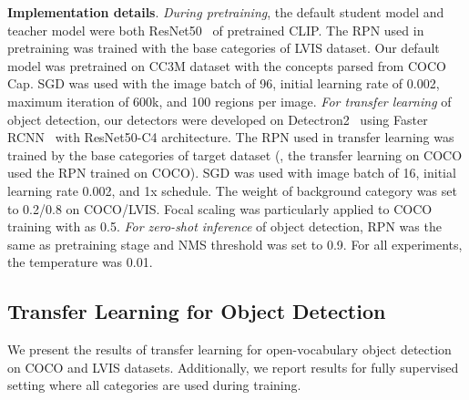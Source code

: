 \smallskip
\noindent \textbf{Implementation details}.
\textit{During pretraining}, the default student model and teacher model were both ResNet50~\cite{he2016deep} of pretrained CLIP. The RPN used in pretraining was trained with the base categories of LVIS dataset. Our default model was pretrained on CC3M dataset with the concepts parsed from COCO Cap. SGD was used with the image batch of 96, initial learning rate of 0.002, maximum iteration of 600k, and 100 regions per image. 
\textit{For transfer learning} of object detection, our detectors were developed on Detectron2~\cite{wu2019detectron2} using Faster RCNN~\cite{faster-rcnn} with ResNet50-C4 architecture. The RPN used in transfer learning was trained by the base categories of target dataset (\eg, the transfer learning on COCO used the RPN trained on COCO). SGD was used with image batch of 16, initial learning rate 0.002, and 1x schedule. The weight of background category was set to 0.2/0.8 on COCO/LVIS. Focal scaling was particularly applied to COCO training with  as 0.5. 
\textit{For zero-shot inference} of object detection, RPN was the same as pretraining stage and NMS threshold was set to 0.9. For all experiments, the temperature  was 0.01.


\subsection{Transfer Learning for Object Detection}
We present the results of transfer learning for open-vocabulary object detection on COCO and LVIS datasets. Additionally, we report results for fully supervised setting where all categories are used during training.


